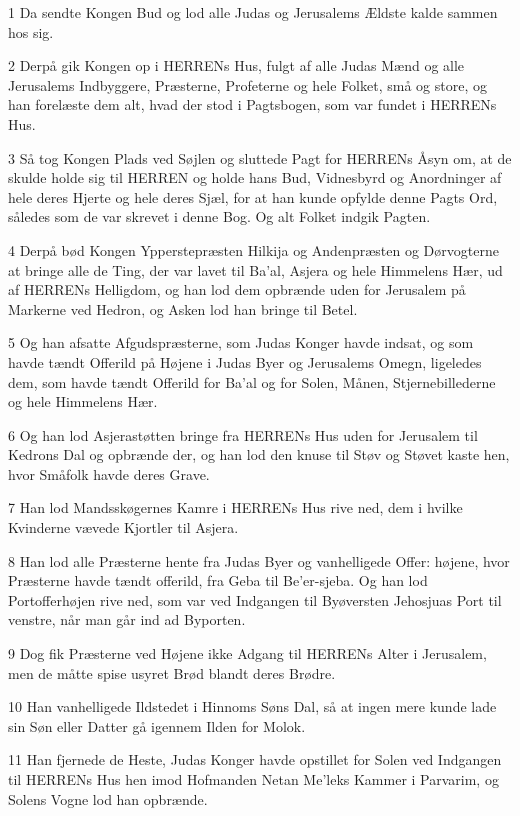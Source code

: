\par 1 Da sendte Kongen Bud og lod alle Judas og Jerusalems Ældste kalde sammen hos sig.
\par 2 Derpå gik Kongen op i HERRENs Hus, fulgt af alle Judas Mænd og alle Jerusalems Indbyggere, Præsterne, Profeterne og hele Folket, små og store, og han forelæste dem alt, hvad der stod i Pagtsbogen, som var fundet i HERRENs Hus.
\par 3 Så tog Kongen Plads ved Søjlen og sluttede Pagt for HERRENs Åsyn om, at de skulde holde sig til HERREN og holde hans Bud, Vidnesbyrd og Anordninger af hele deres Hjerte og hele deres Sjæl, for at han kunde opfylde denne Pagts Ord, således som de var skrevet i denne Bog. Og alt Folket indgik Pagten.
\par 4 Derpå bød Kongen Ypperstepræsten Hilkija og Andenpræsten og Dørvogterne at bringe alle de Ting, der var lavet til Ba'al, Asjera og hele Himmelens Hær, ud af HERRENs Helligdom, og han lod dem opbrænde uden for Jerusalem på Markerne ved Hedron, og Asken lod han bringe til Betel.
\par 5 Og han afsatte Afgudspræsterne, som Judas Konger havde indsat, og som havde tændt Offerild på Højene i Judas Byer og Jerusalems Omegn, ligeledes dem, som havde tændt Offerild for Ba'al og for Solen, Månen, Stjernebillederne og hele Himmelens Hær.
\par 6 Og han lod Asjerastøtten bringe fra HERRENs Hus uden for Jerusalem til Kedrons Dal og opbrænde der, og han lod den knuse til Støv og Støvet kaste hen, hvor Småfolk havde deres Grave.
\par 7 Han lod Mandsskøgernes Kamre i HERRENs Hus rive ned, dem i hvilke Kvinderne vævede Kjortler til Asjera.
\par 8 Han lod alle Præsterne hente fra Judas Byer og vanhelligede Offer: højene, hvor Præsterne havde tændt offerild, fra Geba til Be'er-sjeba. Og han lod Portofferhøjen rive ned, som var ved Indgangen til Byøversten Jehosjuas Port til venstre, når man går ind ad Byporten.
\par 9 Dog fik Præsterne ved Højene ikke Adgang til HERRENs Alter i Jerusalem, men de måtte spise usyret Brød blandt deres Brødre.
\par 10 Han vanhelligede Ildstedet i Hinnoms Søns Dal, så at ingen mere kunde lade sin Søn eller Datter gå igennem Ilden for Molok.
\par 11 Han fjernede de Heste, Judas Konger havde opstillet for Solen ved Indgangen til HERRENs Hus hen imod Hofmanden Netan Me'leks Kammer i Parvarim, og Solens Vogne lod han opbrænde.
